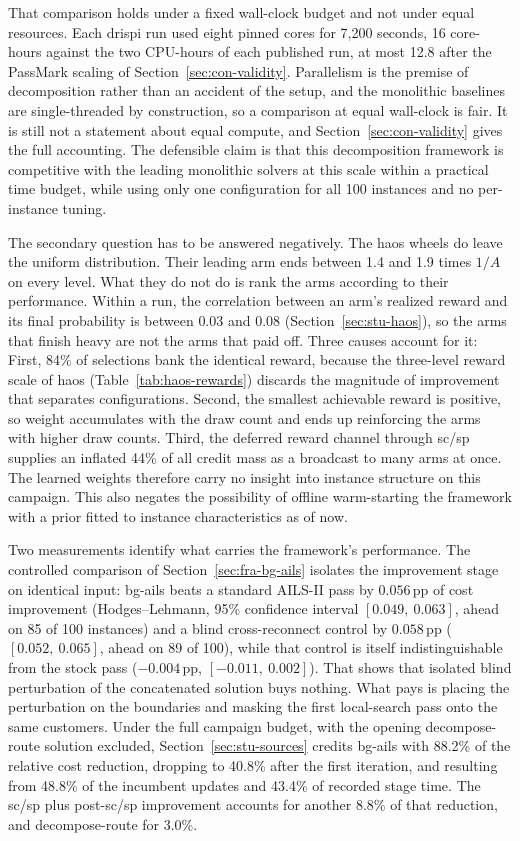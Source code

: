 That comparison holds under a fixed wall-clock budget and not under equal
resources. Each \gls{drispi} run used eight pinned cores for 7,200 seconds, 16
core-hours against the two CPU-hours of each published run, at most 12.8 after
the PassMark scaling of Section~\ref{sec:con-validity}. Parallelism is
the premise of decomposition rather than an accident of the setup, and the
monolithic baselines are single-threaded by construction, so a comparison at
equal wall-clock is fair. It is still not a
statement about equal compute, and Section~\ref{sec:con-validity} gives
the full accounting. The defensible claim is that this decomposition framework
is competitive with the leading monolithic solvers at this scale within a
practical time budget, while using only one configuration for all 100 instances and no
per-instance tuning.

The secondary question has to be answered negatively. The \gls{haos} wheels do leave the uniform distribution. Their leading arm ends between 1.4 and 1.9 times $1/A$ on every level. What they do not do is rank the
arms according to their performance. Within a run, the correlation between an arm's realized reward and its
final probability is between $0.03$ and $0.08$
(Section~\ref{sec:stu-haos}), so the arms that finish heavy are not the arms
that paid off. Three causes account for it: First, 84\% of selections bank
the identical reward, because the three-level reward scale of \gls{haos} 
(Table~\ref{tab:haos-rewards}) discards the magnitude of improvement that separates
configurations. Second, the smallest achievable reward is positive, so weight accumulates with the
draw count and ends up reinforcing the arms with higher draw counts. Third, the deferred reward 
channel through \gls{sc}/\gls{sp} supplies an inflated 44\% of all credit mass as a broadcast to many arms at once. The
learned weights therefore carry no insight into instance structure on this
campaign. This also negates the possibility of offline warm-starting the framework 
with a prior fitted to instance characteristics as of now.

Two measurements identify what carries the framework's performance. The controlled
comparison of Section~\ref{sec:fra-bg-ails} isolates the improvement stage on
identical input: \gls{bg-ails} beats a standard AILS-II pass by $0.056$\,pp of cost
improvement (Hodges--Lehmann, 95\% confidence interval $[0.049,\ 0.063]$, ahead
on 85 of 100 instances) and a blind cross-reconnect control by $0.058$\,pp
($[0.052,\ 0.065]$, ahead on 89 of 100), while that control is itself
indistinguishable from the stock pass ($-0.004$\,pp, $[-0.011,\ 0.002]$).
That shows that isolated blind perturbation of the concatenated solution buys nothing. What pays is placing the perturbation on the boundaries and masking the first local-search pass onto the same customers. Under the full campaign budget, with the opening decompose-route solution excluded,
Section~\ref{sec:stu-sources} credits \gls{bg-ails} with 88.2\% of the relative cost
reduction, dropping to 40.8\% after the first iteration, and resulting from 48.8\% of the incumbent updates and 43.4\% of recorded stage time. The \gls{sc}/\gls{sp} plus post-\gls{sc}/\gls{sp} improvement accounts for another 8.8\% of that reduction, and decompose-route for 3.0\%.

